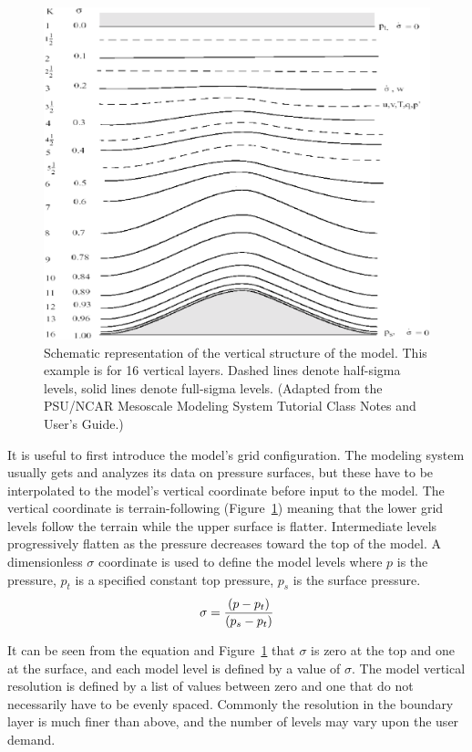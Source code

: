 \begin{figure}[!]
\begin{center}
\includegraphics[scale=0.4]{sigma_levels.eps}
\caption{Schematic representation of the vertical structure of the model.  This example is for 16 vertical layers.  Dashed lines denote half-sigma levels, solid lines denote full-sigma levels. (Adapted from the PSU/NCAR Mesoscale Modeling System Tutorial Class Notes and User's Guide.)}
\label{sigma_levels}
\end{center}
\end{figure}

It is useful to first introduce the model's grid configuration. The modeling system usually gets and analyzes its data on pressure surfaces, but these have to be interpolated to the model's vertical coordinate before input to the model. The vertical coordinate is terrain-following (Figure~\ref{sigma_levels}) meaning that the lower grid levels follow the terrain while the upper surface is flatter. Intermediate levels progressively flatten as the pressure decreases toward the top of the model. A dimensionless $\sigma$ coordinate is used to define the model levels where $p$ is the pressure, $p_t$ is a specified constant top pressure, 
$p_s$ is the surface pressure.
\begin{eqnarray}
\sigma = {(p - p_t) \over (p_s - p_t)}
\end{eqnarray}

It can be seen from the equation and Figure~\ref{sigma_levels} that $\sigma$ is zero at the top and one at the surface, and each model level is defined by a value of $\sigma$. The model vertical resolution is defined by a list of values between zero and one that do not necessarily have to be evenly spaced. Commonly the resolution in the boundary layer is much finer than above, and the number of levels may vary upon the user demand.

